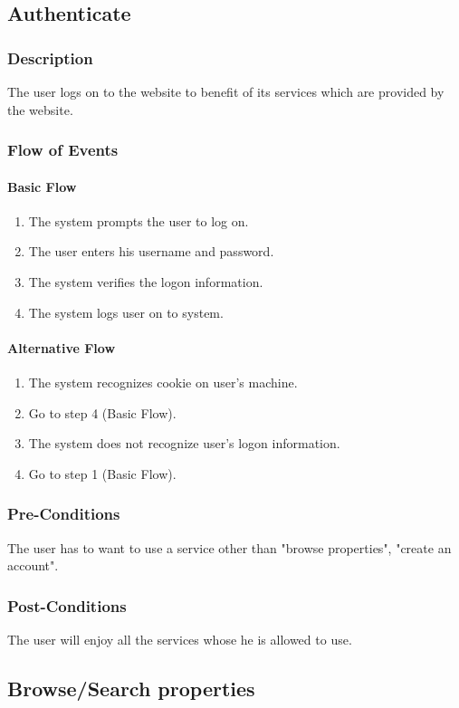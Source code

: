 \documentclass[a4paper,12pt]{article}
\begin{document}
\subsection{Authenticate}
\subsubsection{Description}
The user logs on to the website to benefit of its services which are provided by the website.
\subsubsection{Flow of Events}
\paragraph{Basic Flow}
\begin{enumerate}
\item The system prompts the user to log on.
\item The user enters his username and password.
\item The system verifies the logon information.
\item The system logs user on to system.
\end{enumerate}
\paragraph{Alternative Flow}
\begin{enumerate}
\item The system recognizes cookie on user's machine. 
\item Go to step 4 (Basic Flow).
\item The system does not recognize user's logon information.
\item Go to step 1 (Basic Flow).
\end{enumerate}
\subsubsection{Pre-Conditions}
The user has to want to use a service other than "browse properties", "create an account".
\subsubsection{Post-Conditions}
The user will enjoy all the services whose he is allowed to use.

\subsection{Browse/Search properties}
\end{document}
